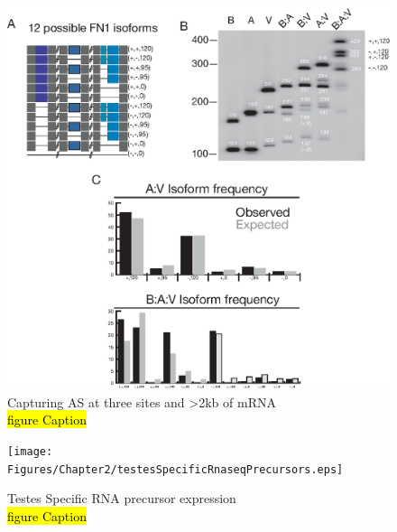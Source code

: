   \begin{figure}[htbp] %
    \centering 
    \includegraphics{Figures/Chapter2/fn1ThreeSite.eps}
    \caption[Three sites of AS in \fn{} by SeqZip]
    {
      Capturing AS at three sites and >2kb of mRNA\\
      \hl{figure Caption}
	    }
    \label{fig:Hiv tx via SeqZip}
  	\end{figure}

  \begin{figure}[htbp] %
    \centering 
    \texttt{[image: Figures/Chapter2/testesSpecificRnaseqPrecursors.eps]}
    \caption[Testes Specific RNA precursor expression]
    {
      Testes Specific RNA precursor expression\\
      \hl{figure Caption}
    	}
    \label{fig:Hiv tx via SeqZip}
  	\end{figure}

